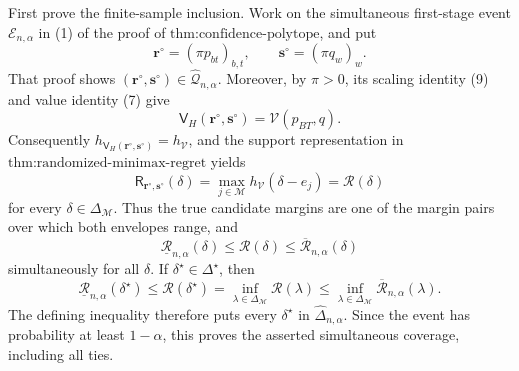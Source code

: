 First prove the finite-sample inclusion.  Work on the simultaneous first-stage event \(\mathcal E_{n,\alpha}\) in (1) of the proof of \(\text{thm:confidence-polytope}\), and put
\[
 \mathbf r^\circ=(\pi p_{bt})_{b,t},\qquad
 \mathbf s^\circ=(\pi q_w)_w.                            \tag{1}
\]
That proof shows \((\mathbf r^\circ,\mathbf s^\circ)\in\widehat{\mathcal Q}_{n,\alpha}\).  Moreover, by \(\pi>0\), its scaling identity (9) and value identity (7) give
\[
 \mathsf V_H(\mathbf r^\circ,\mathbf s^\circ)
 =\mathcal V(p_{BT},q).                                  \tag{2}
\]
Consequently \(h_{\mathsf V_H(\mathbf r^\circ,\mathbf s^\circ)}=h_{\mathcal V}\), and the support representation in \(\text{thm:randomized-minimax-regret}\) yields
\[
 \mathsf R_{\mathbf r^\circ,\mathbf s^\circ}(\delta)
 =\max_{j\in\mathcal M}h_{\mathcal V}(\delta-e_j)
 =\mathcal R(\delta)                                    \tag{3}
\]
for every \(\delta\in\Delta_{\mathcal M}\).  Thus the true candidate margins are one of the margin pairs over which both envelopes range, and
\[
 \underline{\mathcal R}_{n,\alpha}(\delta)
 \le\mathcal R(\delta)
 \le\overline{\mathcal R}_{n,\alpha}(\delta)             \tag{4}
\]
simultaneously for all \(\delta\).  If \(\delta^\star\in\Delta^\star\), then
\[
 \underline{\mathcal R}_{n,\alpha}(\delta^\star)
 \le\mathcal R(\delta^\star)
 =\inf_{\lambda\in\Delta_{\mathcal M}}\mathcal R(\lambda)
 \le\inf_{\lambda\in\Delta_{\mathcal M}}
      \overline{\mathcal R}_{n,\alpha}(\lambda).         \tag{5}
\]
The defining inequality therefore puts every \(\delta^\star\) in \(\widehat{\Delta}_{n,\alpha}\).  Since the event has probability at least \(1-\alpha\), this proves the asserted simultaneous coverage, including all ties.

